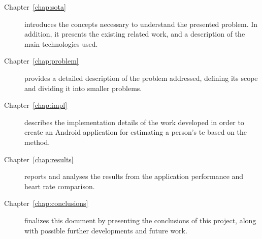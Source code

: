 \begin{description}
  \item[Chapter~\ref{chap:sota}] introduces the concepts necessary to
        understand the presented problem. In addition, it presents
        the existing related work, and a description of the main
        technologies used.
  \item[Chapter~\ref{chap:problem}] provides a detailed description of the
        problem addressed, defining its scope and dividing it into
        smaller problems.
  \item[Chapter~\ref{chap:impl}] describes the implementation details of the
        work developed in order to create an Android application for estimating
        a person's te based on the \evm{} method.
  \item[Chapter~\ref{chap:results}] reports and analyses the results from
        the application performance and heart rate comparison.
  \item[Chapter~\ref{chap:conclusions}] finalizes this document by presenting
        the conclusions of this project, along with possible further
        developments and future work.
\end{description}
